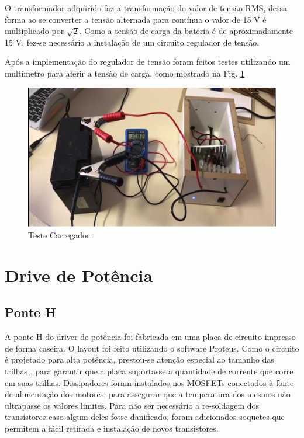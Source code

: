 O transformador adquirido faz a transformação do valor de tensão RMS, dessa forma ao se converter a tensão alternada para contínua o valor de 15 V é multiplicado por $\sqrt{2}$. Como a tensão de carga da bateria é de aproximadamente 15 V, fez-se necessário a instalação de um circuito regulador de tensão.

Após a implementação do regulador de tensão foram feitos testes utilizando um multímetro para aferir a tensão de carga, como mostrado na Fig. \ref{fig:teste_carregador.png}

\begin{figure}
    \begin{center}
        \includegraphics{figuras/teste_carregador.png}
    \end{center}
    \caption{Teste Carregador}
    \label{fig:teste_carregador.png}
\end{figure}

\section{Drive de Potência}

\subsection{Ponte H}

A ponte H do driver de potência foi fabricada em uma placa de circuito impresso de forma caseira. O layout foi feito utilizando o software Proteus. Como o circuito é projetado para alta potência, prestou-se atenção especial ao tamanho das trilhas , para garantir que a placa suportasse a quantidade de corrente que corre em suas trilhas. Dissipadores foram instalados nos MOSFETs conectados à fonte de alimentação dos motores, para assegurar que a temperatura dos mesmos não ultrapasse os valores limites. Para não ser necessário a re-soldagem dos transistores caso algum deles fosse danificado, foram adicionados soquetes que permitem a fácil retirada e instalação de novos transistores.

